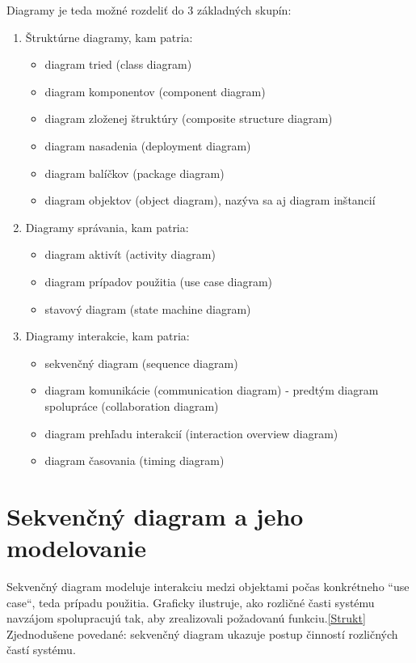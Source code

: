 \documentclass[10pt,twoside,slovak,a4paper]{article}
\begin{document}
 Diagramy je teda možné rozdeliť do 3 základných skupín\cite{WIKI}:

\begin{enumerate}
\item Štruktúrne diagramy, kam patria:
	\begin{itemize}
	\item diagram tried (class diagram)
	\item diagram komponentov (component diagram)
	\item diagram zloženej štruktúry (composite structure diagram)
	\item diagram nasadenia (deployment diagram)
	\item diagram balíčkov (package diagram)
	\item diagram objektov (object diagram), nazýva sa aj diagram inštancií
	\end{itemize}
\item Diagramy správania, kam patria:
	\begin{itemize}
	\item diagram aktivít (activity diagram)
	\item diagram prípadov použitia (use case diagram)
	\item stavový diagram (state machine diagram)
	\end{itemize}

\item Diagramy interakcie, kam patria:
	\begin{itemize}
	\item sekvenčný diagram (sequence diagram)
	\item diagram komunikácie (communication diagram) - predtým diagram spolupráce (collaboration diagram)
	\item diagram prehľadu interakcií (interaction overview diagram)
	\item diagram časovania (timing diagram)
	\end{itemize}
\end{enumerate}



\section{Sekvenčný diagram a jeho modelovanie} \label{3sek}

Sekvenčný diagram modeluje interakciu medzi objektami počas konkrétneho ``use case“, teda prípadu použitia. Graficky ilustruje, ako rozličné časti systému navzájom spolupracujú tak, aby zrealizovali požadovanú funkciu.\ref{Strukt} Zjednodušene povedané: sekvenčný diagram ukazuje postup činností rozličných častí systému\cite{SDT}.\newline
\end{document}
